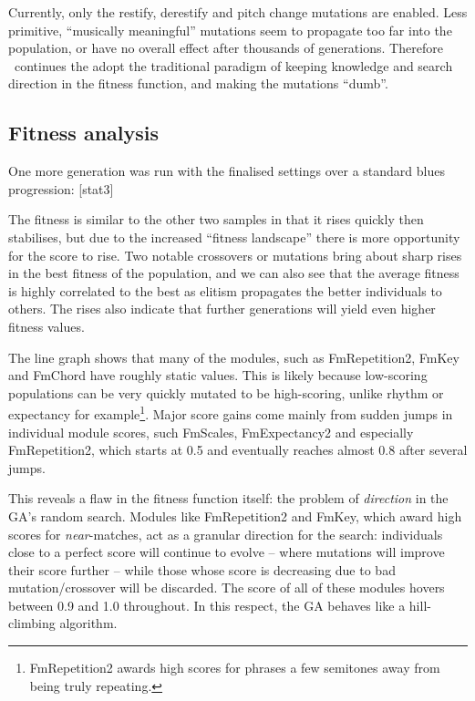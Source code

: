 Currently, only the restify, derestify and pitch change mutations are enabled. Less primitive, ``musically meaningful'' mutations seem to propagate too far into the population, or have no overall effect after thousands of generations. Therefore \jg\ continues the adopt the traditional paradigm of keeping knowledge and search direction in the fitness function, and making the mutations ``dumb''.

\subsection{Fitness analysis}

One more generation was run with the finalised settings over a standard blues progression: [stat3]


The fitness is similar to the other two samples in that it rises quickly then stabilises, but due to the increased ``fitness landscape'' there is more opportunity for the score to rise. Two notable crossovers or mutations bring about sharp rises in the best fitness of the population, and we can also see that the average fitness is highly correlated to the best as elitism propagates the better individuals to others. The rises also indicate that further generations will yield even higher fitness values.


The line graph shows that many of the modules, such as FmRepetition2, FmKey and FmChord have roughly static values. This is likely because low-scoring populations can be very quickly mutated to be high-scoring, unlike rhythm or expectancy for example\footnote{FmRepetition2 awards high scores for phrases a few semitones away from being truly repeating.}. Major score gains come mainly from sudden jumps in individual module scores, such FmScales, FmExpectancy2 and especially FmRepetition2, which starts at 0.5 and eventually reaches almost 0.8 after several jumps.

This reveals a flaw in the fitness function itself: the problem of \emph{direction} in the GA's random search. Modules like FmRepetition2 and FmKey, which award high scores for \emph{near}-matches, act as a granular direction for the search: individuals close to a perfect score will continue to evolve -- where mutations will improve their score further -- while those whose score is decreasing due to bad mutation/crossover will be discarded. The score of all of these modules hovers between 0.9 and 1.0 throughout. In this respect, the GA behaves like a hill-climbing algorithm.

